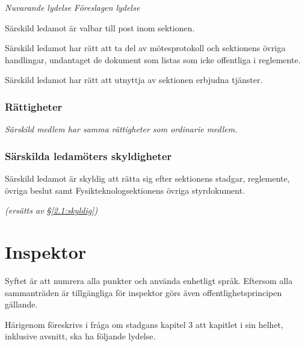 \documentclass{article}
\newenvironment{lydelse}
    {\begin{paracol}{2}%
        \emph{Nuvarande lydelse}%
        \switchcolumn%
        \emph{Föreslagen lydelse}%
    \end{paracol}%
    \begin{enumerate}[label=\thesubsection.\arabic*]%
    \begin{paracol}{2}%
    }{\end{paracol}\end{enumerate}}
\newcommand{\itemb}{\item[\textbullet]}
\begin{document}
\begin{lydelse}
   \itemb Särskild ledamot är valbar till post inom sektionen.

   \itemb Särskild ledamot har rätt att ta del av mötesprotokoll och sektionens övriga handlingar, undantaget de dokument som listas som icke offentliga i reglemente.
   
   \itemb Särskild ledamot har rätt att utnyttja av sektionen erbjudna tjänster.
    
\switchcolumn
    \subsubsection*{Rättigheter}%

  


    \item \emph{Särskild medlem har samma rättigheter som ordinarie medlem.}

\switchcolumn*
    \subsubsection*{Särskilda ledamöters skyldigheter}%
    \itemb Särskild ledamot är skyldig att rätta sig efter sektionens stadgar, regle\-mente, övriga beslut samt  Fysikteknologsektionens övriga styrdokument.
    
\switchcolumn
    \emph{(ersätts av \S \ref{2.1:skyldig})}
\end{lydelse}

\section{Inspektor}
Syftet är att numrera alla punkter och använda enhetligt språk.
Eftersom alla sammanträden är tillgängliga för inspektor görs även offentlighetsprincipen gällande.

Härigenom föreskrivs i fråga om stadgans kapitel 3 att kapitlet i sin helhet, inklusive avsnitt, ska ha följande lydelse.
\end{document}
